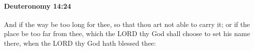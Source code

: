 
		\paragraph{Deuteronomy 14:24} %
			\label{DEUTERONOMY-14-24}

			And if the way be too long for thee, so that thou art not able to carry it; or if the place be too far from thee, which the LORD thy God shall choose to set his name there, when the LORD thy God hath blessed thee:



